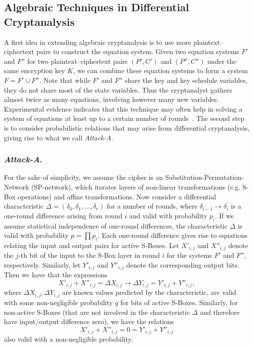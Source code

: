 \documentclass{llncs}
\begin{document}
\subsection{Algebraic Techniques in Differential Cryptanalysis}

A first idea in extending algebraic cryptanalysis is to use more
plain\-text--cipher\-text pairs to construct the equation system. Given two
equation systems $F'$ and $F''$ for two plaintext--ciphertext pairs $(P',C')$
and $(P'',C'')$ under the same encryption key $K$, we can combine these
equation systems to form a system $F = F' \cup F''$. Note that while $F'$ and
$F''$ share the key and key schedule variables, they do not share most of the
state variables. Thus the cryptanalyst gathers almost twice as many equations,
involving however many new variables. Experimental evidence indicates that this
technique may often help in solving a system of equations at least up to a
certain
number of rounds~\cite{faugere:fse2007}. The second step is to consider
probabilistic relations that may arise from differential cryptanalysis, giving
rise to what we call \emph{Attack-A}.

\subsubsection{\emph{Attack-A}.}

For the sake of simplicity, we assume the cipher is an
Substitution-Permutation-Network (SP-network), which iterates
layers of non-linear transformations (e.g. S-Box operations) and affine
transformations. Now consider a differential characteristic $\Delta = (\delta_0,
\delta_1, \ldots , \delta_r)$ for a number of
rounds, where $\delta_{i-1} \rightarrow \delta_{i}$ is a one-round difference
arising from round $i$ and valid with
probability $p_{i}$. If we assume statistical independence of one-round
differences, the characteristic $\Delta$ is valid with probability $p = \prod
p_i$. Each
one-round difference gives rise to equations relating the input and output pairs
for active S-Boxes. Let $X'_{i,j}$ and $X''_{i,j}$ denote the $j$-th bit of the
input to the S-Box layer in round $i$ for the systems $F'$ and $F''$,
respectively. Similarly, let $Y'_{i,j}$ and $Y''_{i,j}$ denote the corresponding
output bits. Then we have that the expressions
$$
X'_{i,j} + X''_{i,j} = \Delta X_{i,j} \rightarrow \Delta Y_{i,j} =
Y'_{i,j} + Y''_{i,j},
$$
where $\Delta X_{i,j}, \Delta Y_{i,j}$
are known values predicted by the characteristic, are valid with some
non-negligible probability $q$ for bits of active S-Boxes. Similarly, for
non-active S-Boxes (that are not involved in the characteristic $\Delta$ and
therefore have input/output difference zero), we have the relations
$$
X'_{i,j} + X''_{i,j} = 0 = Y'_{i,j} + Y''_{i,j}
$$
also valid with a non-negligible probability.
\end{document}
